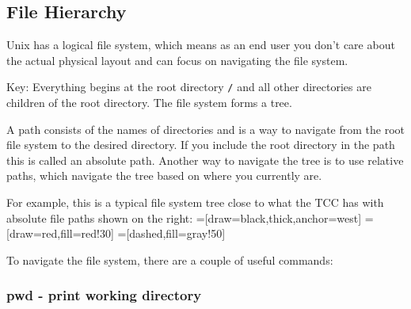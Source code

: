 \documentclass[12pt,hidelinks]{article}
\begin{document}
\begin{appendices}
\subsection{File Hierarchy}

Unix has a logical file system, which means as an end user you don't care about the
actual physical layout and can focus on navigating the file system.

Key: Everything begins at the root directory
\texttt{/} and all other directories are children of the root directory. The
file system forms a tree.

A path consists of the names of directories and is a way to navigate from the root file system to the
desired directory. If you include the root directory in the path this
is called an absolute path. Another way to navigate the tree is to use
relative paths, which navigate the tree based on where you currently are.

For example, this is a typical file system tree close to what the TCC has with
absolute file paths shown on the right:
=[draw=black,thick,anchor=west]
=[draw=red,fill=red!30]
=[dashed,fill=gray!50]

  
To navigate the file system, there are a couple of useful commands:

\subsubsection{pwd - \textbf{p}rint \textbf{w}orking \textbf{d}irectory}


\end{appendices}
\end{document}
